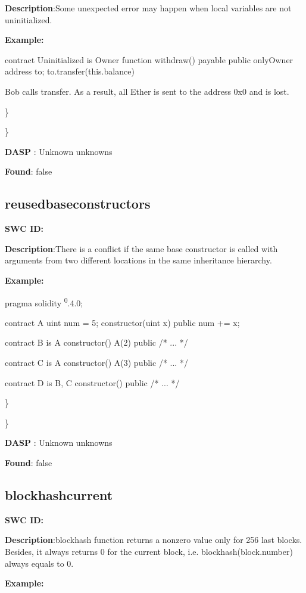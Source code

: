 \documentclass{article}
\begin{document}
{{\textbf{Description}:Some unexpected error may happen when local variables are not uninitialized.


\textbf{Example:} 

contract Uninitialized is Owner{
    function withdraw() payable public onlyOwner{
        address to;
        to.transfer(this.balance)
    }
}

Bob calls transfer. As a result, all Ether is sent to the address 0x0 and is lost.

\} 

\} 

\textbf{DASP} : Unknown unknowns

\textbf{Found}: false

\subsection{reused\textunderscore base\textunderscore constructors} 
\textbf{SWC \textunderscore ID:} 

\textbf{Description}:There is a conflict if the same base constructor is called with arguments from two different locations in the same inheritance hierarchy.


\textbf{Example:} 

pragma solidity \textsuperscript0.4.0;

contract A{
    uint num = 5;
    constructor(uint x) public{
        num += x;
    }
}

contract B is A{
    constructor() A(2) public { /* ... */ }
}

contract C is A {
    constructor() A(3) public { /* ... */ }
}

contract D is B, C {
    constructor() public { /* ... */ }
}

\} 

\} 

\textbf{DASP} : Unknown unknowns

\textbf{Found}: false

\subsection{blockhash\textunderscore current} 
\textbf{SWC \textunderscore ID:} 

\textbf{Description}:blockhash function returns a non\textendash zero value only for 256 last blocks. Besides, it always returns 0 for the current block, i.e. blockhash(block.number) always equals to 0.


\textbf{Example:} 

}}
\end{document}
